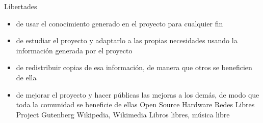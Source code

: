 Libertades
\begin{itemize}
	\item de usar el conocimiento generado en el proyecto para cualquier fin
	\item de estudiar el proyecto y adaptarlo a las propias necesidades
usando la información generada por el proyecto
	\item de redistribuir copias de esa información, de manera que otros se beneficien de ella
	\item de mejorar el proyecto y hacer públicas las mejoras a los demás, de modo que toda la comunidad se beneficie de ellas
	\subitem Open Source Hardware
	\subitem Redes Libres
	\subitem Project Gutenberg
	\subitem Wikipedia, Wikimedia
	\subitem Libros libres, música libre
\end{itemize}



